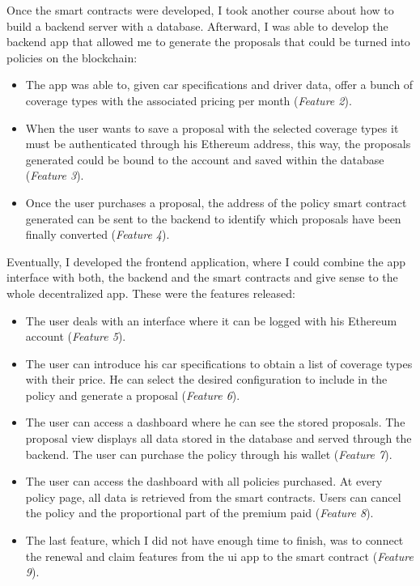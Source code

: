  {Once the smart contracts were developed, I took another course about how to build a backend server with a database. Afterward, I was able to develop the backend app that allowed me to generate the proposals that could be turned into policies on the blockchain:
 \begin{itemize}
     \item The app was able to, given car specifications and driver data, offer a bunch of coverage types with the associated pricing per month (\textit{Feature 2}).
     \item When the user wants to save a proposal with the selected coverage types it must be authenticated through his Ethereum address, this way, the proposals generated could be bound to the account and saved within the database (\textit{Feature 3}).
     \item Once the user purchases a proposal, the address of the policy smart contract generated can be sent to the backend to identify which proposals have been finally converted (\textit{Feature 4}).
 \end{itemize}
 
 {Eventually, I developed the frontend application, where I could combine the app interface with both, the backend and the smart contracts and give sense to the whole decentralized app. These were the features released:}
 \begin{itemize}
     \item The user deals with an interface where it can be logged with his Ethereum account (\textit{Feature 5}).
     \item The user can introduce his car specifications to obtain a list of coverage types with their price. He can select the desired configuration to include in the policy and generate a proposal (\textit{Feature 6}).
     \item The user can access a dashboard where he can see the stored proposals. The proposal view displays all data stored in the database and served through the backend. The user can purchase the policy through his wallet (\textit{Feature 7}).
     \item The user can access the dashboard with all policies purchased. At every policy page, all data is retrieved from the smart contracts. Users can cancel the policy and the proportional part of the premium paid (\textit{Feature 8}).
     \item The last feature, which I did not have enough time to finish, was to connect the renewal and claim features from the \acrshort{ui} app to the smart contract (\textit{Feature 9}).
 \end{itemize}

}
